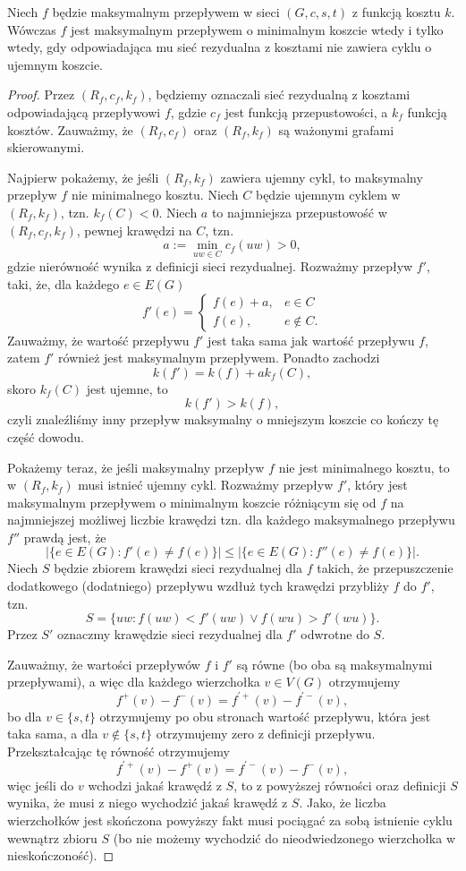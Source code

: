 \begin{theorem}
	 Niech $f$ będzie
	maksymalnym przepływem w sieci $(G, c, s, t)$ z funkcją 
	kosztu $k$. Wówczas $f$ jest maksymalnym przepływem 
	o minimalnym koszcie wtedy i tylko wtedy, gdy 
	odpowiadająca mu sieć rezydualna z kosztami
	nie zawiera cyklu o ujemnym koszcie.
	\begin{proof}
		Przez $(R_f, c_f, k_f)$, będziemy oznaczali sieć rezydualną
		z kosztami odpowiadającą przepływowi $f$, gdzie $c_f$ 
		jest funkcją przepustowości, a $k_f$ funkcją kosztów.
		Zauważmy, że $(R_f, c_f)$ oraz $(R_f, k_f)$ są ważonymi 
		grafami skierowanymi.
		
		Najpierw pokażemy, że jeśli $(R_f, k_f)$ zawiera ujemny cykl,
		to maksymalny przepływ $f$ nie minimalnego kosztu.
		Niech $C$ będzie ujemnym cyklem w $(R_f, k_f)$, tzn. $k_f(C) < 0$.
		Niech $a$ to najmniejsza przepustowość w $(R_f, c_f, k_f)$, pewnej
		krawędzi na $C$, tzn.
		\[a := \min_{uw \in C} c_f(uw) > 0,\]
		gdzie nierówność wynika z definicji sieci rezydualnej. Rozważmy 
		przepływ $f'$, taki, że, dla każdego
		$e \in E(G)$
		\[f'(e) = \begin{cases} 
			f(e) + a, &  e \in C \\
			f(e), & e \notin C.
		\end{cases}\]
		Zauważmy, że wartość przepływu $f'$ jest taka sama
		jak wartość przepływu $f$, zatem $f'$ również jest
		maksymalnym przepływem. Ponadto zachodzi 
		\[k(f') = k(f) + ak_f(C),\]
		skoro $k_f(C)$ jest ujemne, to 
		\[k(f') > k(f),\]
		czyli znaleźliśmy inny przepływ maksymalny o mniejszym koszcie
		co kończy tę część dowodu.
		
		Pokażemy teraz, że jeśli maksymalny przepływ $f$
		nie jest minimalnego kosztu, to w $(R_f, k_f)$ musi istnieć
		ujemny cykl. Rozważmy przepływ $f'$, który jest
		maksymalnym przepływem o minimalnym koszcie różniącym
		się od $f$ na najmniejszej możliwej liczbie krawędzi tzn.
		dla każdego maksymalnego przepływu $f''$ prawdą jest, że
		\[|\{e \in E(G) : f'(e) \not = f(e)\}| \leq 
		|\{e \in E(G) : f''(e) \not = f(e)\}|.\]
		Niech $S$ będzie zbiorem krawędzi sieci rezydualnej dla $f$ 
		takich, że przepuszczenie dodatkowego (dodatniego)
		przepływu wzdłuż tych krawędzi przybliży $f$ do $f'$, tzn.
		\[S = \{uw : f(uw) < f'(uw) \lor f(wu) > f'(wu)\}.\]
		Przez $S'$ oznaczmy krawędzie sieci rezydualnej dla $f'$
		odwrotne do $S$.
		
		Zauważmy, że wartości przepływów $f$ i $f'$ są równe (bo oba są
		maksymalnymi przepływami), a więc dla każdego wierzchołka
		$v \in V(G)$ otrzymujemy
		\[f^+(v) - f^-(v) = f^{'+}(v) - f^{'-}(v),\]
		bo dla $v \in \{s, t\}$ otrzymujemy po obu 
		stronach wartość przepływu, która jest taka sama, a
		dla  $v \not \in \{s, t\}$ otrzymujemy zero z definicji przepływu.
		Przekształcając tę równość otrzymujemy
		\[f^{'+}(v) - f^+(v) = f^{'-}(v) - f^{-}(v),\]
		więc jeśli do $v$ wchodzi jakaś krawędź z $S$, to 
		z powyższej równości oraz definicji $S$ wynika, że
		musi z niego wychodzić jakaś krawędź z $S$. Jako, że
		liczba wierzchołków jest skończona powyższy fakt musi 
		pociągać za sobą istnienie cyklu wewnątrz zbioru $S$ (bo
		nie możemy wychodzić
		do nieodwiedzonego wierzchołka w nieskończoność).
		

\end{proof}
\end{theorem}
